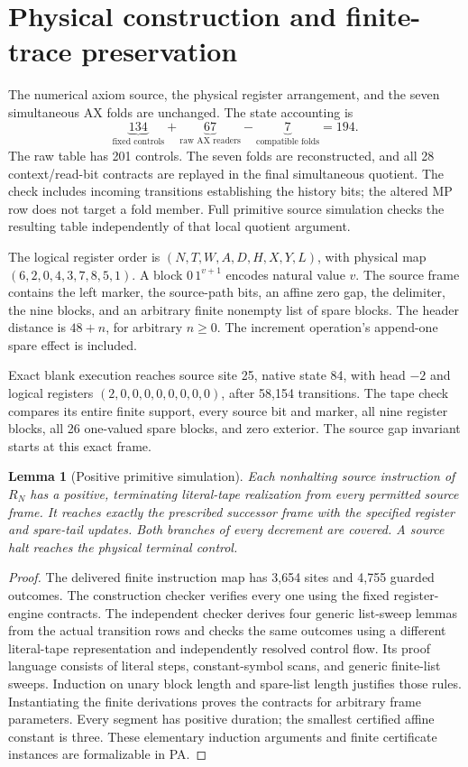 \documentclass[11pt,letterpaper]{article}
\newtheorem{lemma}[theorem]{Lemma}
\begin{document}
\section{Physical construction and finite-trace preservation}
\label{sec:physical}

The numerical axiom source, the physical register arrangement, and the
seven simultaneous AX folds are unchanged. The state accounting is
\[
 \underbrace{134}_{\text{fixed controls}}+
 \underbrace{67}_{\text{raw AX readers}}-
 \underbrace{7}_{\text{compatible folds}}=194.
\]
The raw table has 201 controls. The seven folds are reconstructed, and
all 28 context/read-bit contracts are replayed in the final simultaneous
quotient. The check includes incoming transitions establishing the history
bits; the altered MP row does not target a fold member. Full primitive
source simulation checks the resulting table independently of that local
quotient argument.

The logical register order is $(N,T,W,A,D,H,X,Y,L)$, with physical map
$(6,2,0,4,3,7,8,5,1)$. A block $0\,1^{v+1}$ encodes natural value $v$.
The source frame contains the left marker, the source-path bits, an affine
zero gap, the delimiter, the nine blocks, and an arbitrary finite nonempty
list of spare blocks. The header distance is $48+n$, for arbitrary
$n\ge0$. The increment operation's append-one spare effect is included.

Exact blank execution reaches source site 25, native state 84, with head
$-2$ and logical registers $(2,0,0,0,0,0,0,0,0)$, after 58,154 transitions.
The tape check compares its entire finite support, every source bit and
marker, all nine register blocks, all 26 one-valued spare blocks, and
zero exterior. The source gap invariant starts at this exact frame.

\begin{lemma}[Positive primitive simulation]
Each nonhalting source instruction of $R_N$ has a positive, terminating
literal-tape realization from every permitted source frame. It reaches
exactly the prescribed successor frame with the specified register and
spare-tail updates. Both branches of every decrement are covered. A source
halt reaches the physical terminal control.
\end{lemma}
\begin{proof}
The delivered finite instruction map has 3,654 sites and 4,755 guarded
outcomes. The construction checker verifies every one using the fixed
register-engine contracts. The independent checker derives four generic
list-sweep lemmas from the actual transition rows and checks the same
outcomes using a different literal-tape representation and independently
resolved control flow. Its proof language consists of literal steps,
constant-symbol scans, and generic finite-list sweeps. Induction on unary
block length and spare-list length justifies those rules. Instantiating
the finite derivations proves the contracts for arbitrary frame parameters.
Every segment has positive duration; the smallest certified affine
constant is three. These elementary induction arguments and finite
certificate instances are formalizable in PA.
\end{proof}
\end{document}

